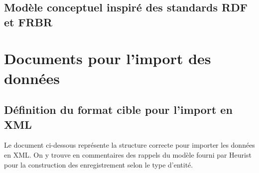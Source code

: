 \documentclass[a4paper,12pt,twoside]{book}
\begin{document}
	\subsection{Modèle conceptuel inspiré des standards RDF et FRBR}
	
	
	
	\section{Documents pour l'import des données}
	
	\subsection{\label{def_cible}Définition du format cible pour l'import en XML}
	
	Le document ci-dessous représente la structure correcte pour importer les données en XML. On y trouve en commentaires des rappels du modèle fourni par Heurist pour la construction des enregistrement selon le type d'entité.
	
\end{document}
